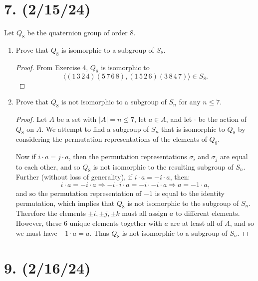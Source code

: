\documentclass{article}
\begin{document}
\section*{7. (2/15/24)}

Let $Q_8$ be the quaternion group of order 8.

\begin{enumerate}[label=(\alph*), itemsep=0em]
    \item Prove that $Q_8$ is isomorphic to a subgroup of $S_8$.
        \begin{proof}
            From Exercise 4, $Q_8$ is isomorphic to
            \begin{equation*}
                \langle (1\,3\,2\,4)(5\,7\,6\,8), (1\,5\,2\,6)(3\,8\,4\,7) \rangle \in S_8.
            \end{equation*}
        \end{proof}
    \item Prove that $Q_8$ is not isomorphic to a subgroup of $S_n$ for any $n \leq 7$.
        \begin{proof}
            Let $A$ be a set with $|A| = n \leq 7$, let $a \in A$, and let $\cdot$ be the action of $Q_8$ on $A$. We attempt to find a subgroup of $S_n$ that is isomorphic to $Q_8$ by considering the permutation representations of the elements of $Q_8$.
            
            Now if $i \cdot a = j \cdot a$, then the permutation representations $\sigma_i$ and $\sigma_j$ are equal to each other, and so $Q_8$ is not isomorphic to the resulting subgroup of $S_n$. Further (without loss of generality), if $i \cdot a = -i \cdot a$, then:
            \begin{equation*}
                i \cdot a = -i \cdot a \Rightarrow -i \cdot i \cdot a = -i \cdot -i \cdot a \Rightarrow a = -1 \cdot a,
            \end{equation*}
            and so the permutation representation of $-1$ is equal to the identity permutation, which implies that $Q_8$ is not isomorphic to the subgroup of $S_n$. Therefore the elements $\pm i, \pm j, \pm k$ must all assign $a$ to different elements. However, these 6 unique elements together with $a$ are at least all of $A$, and so we must have $-1 \cdot a = a$. Thus $Q_8$ is not isomorphic to a subgroup of $S_n$.
        \end{proof}
\end{enumerate}

\section*{9. (2/16/24)}
\end{document}
